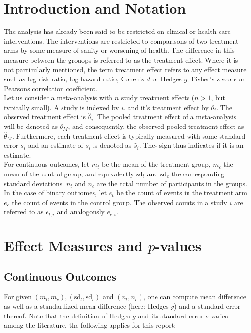 \documentclass[11pt,a4paper,twoside]{book}\usepackage[]{graphicx}\usepackage[]{color}
\begin{document}
\section{Introduction and Notation}
The analysis has already been said to be restricted on clinical or health care interventions. The interventions are restricted to comparisons of two treatment arms by some measure of sanity or worsening of health. The difference in this measure between the grouops is referred to as the treatment effect. Where it is not particularly mentioned, the term treatment effect refers to any effect measure such as log risk ratio, log hazard ratio, Cohen's $d$ or Hedges $g$, Fisher's z score or Pearsons correlation coefficient. \\
Let us consider a meta-analysis with $n$ study treatment effects ($n > 1$, but typically small). A study is indexed by $i$, and it's treatment effect by  $\theta_i$. The observed treatment effect is $\hat{\theta}_i$. The pooled treatment effect of a meta-analysis will be denoted as $\theta_M$, and consequently, the observed pooled treatment effect as $\hat{\theta}_M$. Furthermore, each treatment effect is typically measured with some standard error $s_i$ and an estimate of $s_i$ is denoted as $\hat{s}_i$. The $\hat{}$ sign thus indicates if it is an estimate.\\
For continuous outcomes, let $m_t$ be the mean of the treatment group, $m_c$ the mean of the control group, and equivalently $\textrm{sd}_t$ and $\textrm{sd}_c$ the corresponding standard deviations. $n_t$ and $n_c$ are the total number of participants in the groups.
In the case of binary outcomes, let $e_t$ be the count of events in the treatment arm $e_c$ the count of events in the control group. The observed counts in a study $i$ are referred to as $e_{t,i}$ and analogously $e_{c,i}$.

\section{Effect Measures and $p$-values}
\subsection{Continuous Outcomes}
For given $(m_t, m_c), (\textrm{sd}_t, \textrm{sd}_c)$ and $(n_t, n_c)$, one can compute mean difference as well as a standardized mean difference (here: Hedges $g$) and  a standard error thereof. Note that the definition of Hedges $g$ and its standard error $s$ varies among the literature, the following applies for this report:
\end{document}
